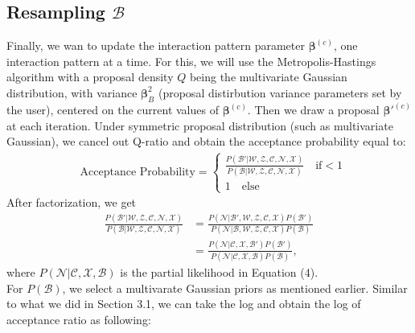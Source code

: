 \documentclass[a4paper]{article}
\begin{document}
 \subsection{Resampling $\mathcal{B}$}
 Finally, we wan to update the interaction pattern parameter $\boldsymbol{\beta}^{(c)}$, one interaction pattern at a time. For this, we will use the Metropolis-Hastings algorithm with a proposal density $Q$ being the multivariate Gaussian distribution, with variance $\boldsymbol{\beta}^2_B$ (proposal distirbution variance parameters set by the
 user), centered on the current values of $\boldsymbol{\beta}^{(c)}$. Then we draw a proposal $\boldsymbol{\beta}'^{(c)}$ at each iteration. Under symmetric proposal distribution (such as multivariate Gaussian), we cancel out Q-ratio and obtain the acceptance probability equal to:
 \begin{equation}
 \begin{split}
 & \mbox{Acceptance Probability}=
 \begin{cases}  \frac{P(\mathcal{B'}|\mathcal{W}, \mathcal{Z}, \mathcal{C}, \mathcal{N}, \mathcal{X})}{P(\mathcal{B}|\mathcal{W}, \mathcal{Z}, \mathcal{C}, \mathcal{N}, \mathcal{X})}\quad\text{if}  <1\\
 1 \quad \text{else}
 \end{cases}
 \end{split}
 \end{equation}
 After factorization, we get
 \begin{equation}
 \begin{aligned}
 \frac{P(\mathcal{B'}|\mathcal{W},\mathcal{Z}, \mathcal{C}, \mathcal{N}, \mathcal{X})}{P(\mathcal{B}|\mathcal{W}, \mathcal{Z}, \mathcal{C}, \mathcal{N}, \mathcal{X})} &=\frac{P(\mathcal{N}|\mathcal{B'}, \mathcal{W}, \mathcal{Z}, \mathcal{C}, \mathcal{X})P(\mathcal{B'})}{P(\mathcal{N}|\mathcal{B}, \mathcal{W}, \mathcal{Z},  \mathcal{C}, \mathcal{X})P(\mathcal{B})}\\&=\frac{P(\mathcal{N}|\mathcal{C}, \mathcal{X}, \mathcal{B'})P(\mathcal{B'})}{P(\mathcal{N}|\mathcal{C}, \mathcal{X}, \mathcal{B})P(\mathcal{B})},
 \end{aligned}
 \end{equation}
 where $P(\mathcal{N}|\mathcal{C}, \mathcal{X}, \mathcal{B})$ is the partial likelihood in Equation (4).\\ \newline For $P(\mathcal{B})$, we select a multivarate Gaussian priors as mentioned earlier. Similar to what we did in Section 3.1, we can take the log and obtain the log of acceptance ratio as following:
\end{document}
